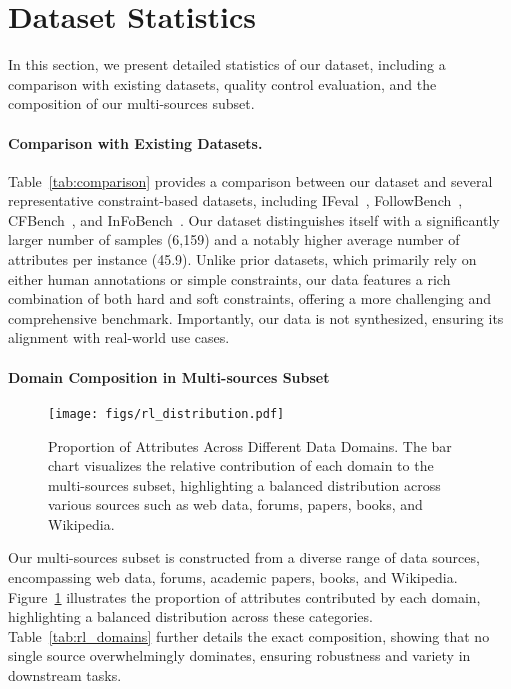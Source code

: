 
\section{Dataset Statistics}
\label{appendix:statistics}

In this section, we present detailed statistics of our dataset, including a comparison with existing datasets, quality control evaluation, and the composition of our multi-sources subset.


\paragraph{Comparison with Existing Datasets.}

Table~\ref{tab:comparison} provides a comparison between our dataset and several representative constraint-based datasets, including IFeval~\cite{zhou2023instruction}, FollowBench~\cite{jiang2023followbench}, CFBench~\cite{zhang2024cfbench}, and InFoBench~\cite{qin2024infobench}. Our dataset distinguishes itself with a significantly larger number of samples (6,159) and a notably higher average number of attributes per instance (45.9). Unlike prior datasets, which primarily rely on either human annotations or simple constraints, our data features a rich combination of both hard and soft constraints, offering a more challenging and comprehensive benchmark. Importantly, our data is not synthesized, ensuring its alignment with real-world use cases.

\paragraph{Domain Composition in Multi-sources Subset}

\begin{figure}[htbp]
    \centering
        \texttt{[image: figs/rl\_distribution.pdf]}
    \caption{Proportion of Attributes Across Different Data Domains. The bar chart visualizes the relative contribution of each domain to the multi-sources subset, highlighting a balanced distribution across various sources such as web data, forums, papers, books, and Wikipedia.}
    \vspace{-1em}
    \label{fig:rl_distribution}
\end{figure}
Our multi-sources subset is constructed from a diverse range of data sources, encompassing web data, forums, academic papers, books, and Wikipedia. Figure~\ref{fig:rl_distribution} illustrates the proportion of attributes contributed by each domain, highlighting a balanced distribution across these categories. Table~\ref{tab:rl_domains} further details the exact composition, showing that no single source overwhelmingly dominates, ensuring robustness and variety in downstream tasks.

